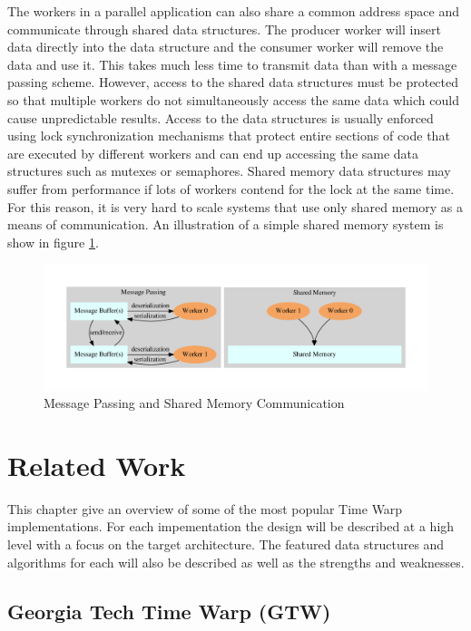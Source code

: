 \documentclass[11pt]{book}
\begin{document}
The workers in a parallel application can also share a common address space and communicate
through shared data structures. The producer worker will insert data directly into the data
structure and the consumer worker will remove the data and use it. This takes much less time
to transmit data than with a message passing scheme. However, access to the shared data
structures must be protected so that multiple workers do not simultaneously access the same
data which could cause unpredictable results. Access to the data structures is usually enforced
using lock synchronization mechanisms that protect entire sections of code that are executed by
different workers and can end up accessing the same data structures such as mutexes or semaphores.
Shared memory data structures may suffer from performance if lots of workers contend for the
lock at the same time. For this reason, it is very hard to scale systems that use only shared
memory as a means of communication. An illustration of a simple shared memory system is show
in figure \ref{communication}.

\begin{figure}[H]
    \centering
    \includegraphics[width=\textwidth,quiet]{figs/graphviz/parallel_communication.pdf}
    \caption{Message Passing and Shared Memory Communication}\label{communication}
\end{figure}



\chapter{Related Work}\label{related_work}

This chapter give an overview of some of the most popular Time Warp implementations. For each
impementation the design will be described at a high level with a focus on the target
architecture. The featured data structures and algorithms for each will also be described
as well as the strengths and weaknesses.

\section{Georgia Tech Time Warp (GTW)}
\end{document}
